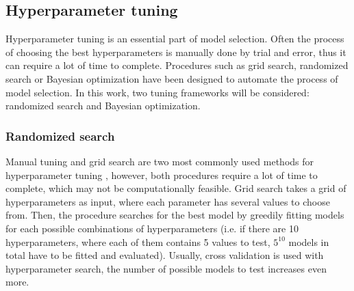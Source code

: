 \documentclass[magisterska, english]{pwr_wmat_praca_dyplomowa}
\theoremstyle{plain}
\numberwithin{theorem}{chapter}
\theoremstyle{definition}
\numberwithin{theorem}{chapter}
\begin{document}
\subsection{Hyperparameter tuning}
Hyperparameter tuning is an essential part of model selection. Often the process of choosing the best hyperparameters is manually done by trial and error, thus it can require a lot of time to complete. Procedures such as grid search, randomized search or Bayesian optimization have been designed to automate the process of model selection. In this work, two tuning frameworks will be considered: randomized search and Bayesian optimization.
\subsubsection{Randomized search}
Manual tuning and grid search are two most commonly used methods for hyperparameter tuning \cite{randomized}, however, both procedures require a lot of time to complete, which may not be computationally feasible. Grid search takes a grid of hyperparameters as input, where each parameter has several values to choose from. Then, the procedure searches for the best model by greedily fitting models for each possible combinations of hyperparameters (i.e. if there are 10 hyperparameters, where each of them contains 5 values to test, $5^10$ models in total have to be fitted and evaluated). Usually, cross validation is used with hyperparameter search, the number of possible models to test increases even more.
\end{document}
